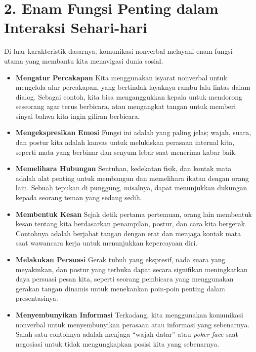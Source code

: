 \documentclass[
  letterpaper,
  DIV=11,
  numbers=noendperiod]{scrreprt}
\begin{document}
\section{2. Enam Fungsi Penting dalam Interaksi
Sehari-hari}\label{enam-fungsi-penting-dalam-interaksi-sehari-hari}

Di luar karakteristik dasarnya, komunikasi nonverbal melayani enam
fungsi utama yang membantu kita menavigasi dunia sosial.

\begin{itemize}
\item
  \textbf{Mengatur Percakapan} Kita menggunakan isyarat nonverbal untuk
  mengelola alur percakapan, yang bertindak layaknya rambu lalu lintas
  dalam dialog. Sebagai contoh, kita bisa menganggukkan kepala untuk
  mendorong seseorang agar terus berbicara, atau mengangkat tangan untuk
  memberi sinyal bahwa kita ingin giliran berbicara.
\item
  \textbf{Mengekspresikan Emosi} Fungsi ini adalah yang paling jelas;
  wajah, suara, dan postur kita adalah kanvas untuk melukiskan perasaan
  internal kita, seperti mata yang berbinar dan senyum lebar saat
  menerima kabar baik.
\item
  \textbf{Memelihara Hubungan} Sentuhan, kedekatan fisik, dan kontak
  mata adalah alat penting untuk membangun dan memelihara ikatan dengan
  orang lain. Sebuah tepukan di punggung, misalnya, dapat menunjukkan
  dukungan kepada seorang teman yang sedang sedih.
\item
  \textbf{Membentuk Kesan} Sejak detik pertama pertemuan, orang lain
  membentuk kesan tentang kita berdasarkan penampilan, postur, dan cara
  kita bergerak. Contohnya adalah berjabat tangan dengan erat dan
  menjaga kontak mata saat wawancara kerja untuk menunjukkan kepercayaan
  diri.
\item
  \textbf{Melakukan Persuasi} Gerak tubuh yang ekspresif, nada suara
  yang meyakinkan, dan postur yang terbuka dapat secara signifikan
  meningkatkan daya persuasi pesan kita, seperti seorang pembicara yang
  menggunakan gerakan tangan dinamis untuk menekankan poin-poin penting
  dalam presentasinya.
\item
  \textbf{Menyembunyikan Informasi} Terkadang, kita menggunakan
  komunikasi nonverbal untuk menyembunyikan perasaan atau informasi yang
  sebenarnya. Salah satu contohnya adalah menjaga ``wajah datar'' atau
  \emph{poker face} saat negosiasi untuk tidak mengungkapkan posisi kita
  yang sebenarnya.
\end{itemize}
\end{document}
